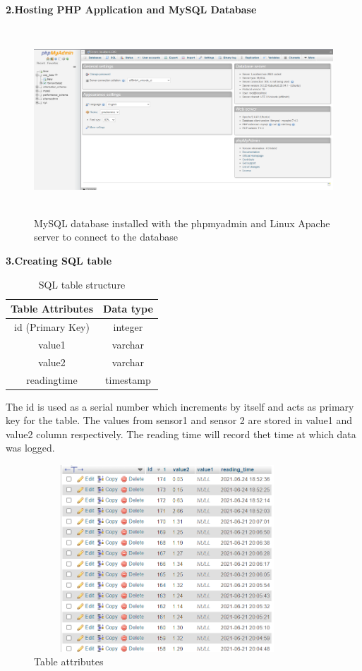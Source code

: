 \documentclass[12 pt]{report}
\begin{document}
 \textbf{2.Hosting PHP Application and MySQL Database}
   \begin{figure}[h!]
\centering
\includegraphics[width=12cm,height = 7cm]{images/phphome.png}
\caption{MySQL database installed with the phpmyadmin and Linux Apache server to connect to the database}
\label{fig:MySQL database}
\end{figure}
\newline

 \textbf{3.Creating SQL table}
 \newline
 
 
 \begin{table}[]
\centering
 \begin{tabular}{||c| c ||} 
 \hline
 Table Attributes & Data type \\ [0.5ex] 
 \hline\hline
 id (Primary Key) & integer \\ 
 \hline
 value1 & varchar \\
 \hline
 value2 & varchar \\
 \hline
 readingtime & timestamp \\ [1ex] 
 \hline
\end{tabular}
\caption{SQL table structure}
 \end{table}
 
 The id is used as a serial number which increments by itself and acts as primary key for the table. The values from sensor1 and sensor 2 are stored in value1 and value2 column respectively. The reading time will record thet time at which data was logged.
   
 \begin{figure}[h!]
\centering
\includegraphics[width=10cm,height = 7cm,frame]{images/table.png}
\caption{Table attributes}
\label{fig:Table attributes}
\end{figure}
\newpage
\end{document}
